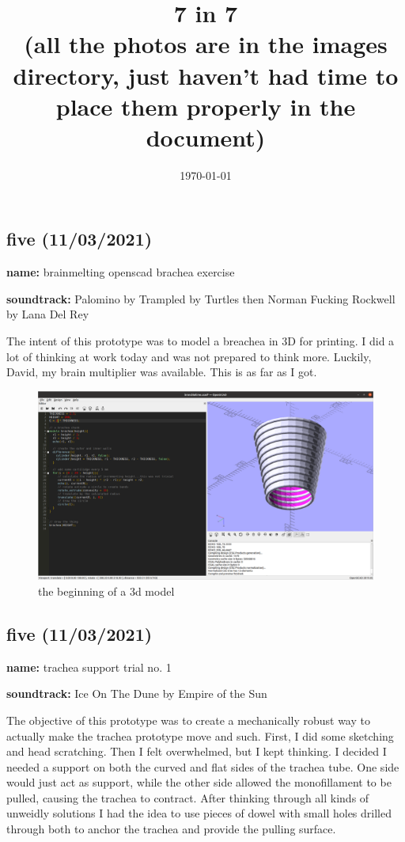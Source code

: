 \documentclass[11pt]{report}
\title{{\LARGE\textbf{7 in 7}} \\ (all the photos are in the images directory, just haven't had time to place them properly in the document)}
\date{\today}
\begin{document}
\maketitle
\clearpage
\subsection*{five (11/03/2021)}
\textbf{name:} brainmelting openscad brachea exercise

\textbf{soundtrack:} Palomino by Trampled by Turtles then Norman Fucking Rockwell by Lana Del Rey 

The intent of this prototype was to model a breachea in 3D for printing. I did a lot of thinking at work today and was not prepared to think more. Luckily, David, my brain multiplier was available. This is as far as I got.
\begin{figure}[h]
\centering
  \includegraphics[width=\textwidth]{images/53.png}
  \caption{the beginning of a 3d model}
\end{figure}




\clearpage
\subsection*{five (11/03/2021)}
\textbf{name:} trachea support trial no. 1

\textbf{soundtrack:} Ice On The Dune by Empire of the Sun

The objective of this prototype was to create a mechanically robust way to actually make the trachea prototype move and such. First, I did some sketching and head scratching. Then I felt overwhelmed, but I kept thinking. I decided I needed a support on both the curved and flat sides of the trachea tube. One side would just act as support, while the other side allowed the monofillament to be pulled, causing the trachea to contract. After thinking through all kinds of unweidly solutions I had the idea to use pieces of dowel with small holes drilled through both to anchor the trachea and provide the pulling surface. 
\end{document}
